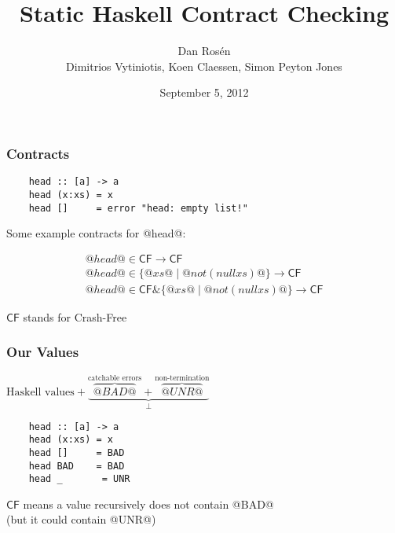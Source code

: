 \documentclass[serif,professionalfont]{beamer}
\title{ {\huge Static Haskell Contract Checking} }
\institute{ Microsoft Research }
\author{ {\Large Dan Ros\'en}
     \vspace{\baselineskip} \\
     Dimitrios Vytiniotis, Koen Claessen, Simon Peyton Jones}
\date{September 5, 2012}
\begin{document}
\maketitle
\makeatactive

\newcommand\cf[0]{\mathsf{CF}}
\newcommand\conj[0]{\&}

\begin{frame}[fragile]
  \frametitle{Contracts}
  \begin{verbatim}
    head :: [a] -> a
    head (x:xs) = x
    head []     = error "head: empty list!"
  \end{verbatim}

  Some example contracts for @head@:

  \[\begin{array}{l}
    @head@ \in \cf \to \cf \\
    @head@ \in \{ @xs@ \mid @not (null xs)@ \} \to \cf \\
    @head@ \in \cf \conj \{ @xs@ \mid @not (null xs)@ \} \to \cf
  \end{array}\]

  $\cf$ stands for Crash-Free
\end{frame}

\begin{frame}[fragile]
  \frametitle{Our Values}
    \begin{center}
    {\Large \center
    $ \text{Haskell values} +
        \underbrace{
            \overbrace{@BAD@}^{\text{catchable errors}} +
            \overbrace{@UNR@}^{\text{non-termination}}
        }_{\bot}
    $
      }

  \begin{verbatim}
    head :: [a] -> a
    head (x:xs) = x
    head []     = BAD
    head BAD    = BAD
    head _       = UNR
  \end{verbatim}

  $\cf$ means a value recursively does not contain @BAD@ \\
  (but it could contain @UNR@)
    \end{center}

\end{frame}

\newcommand\cons[2]{\mathsf{cons}(#1,#2)}
\newcommand\conspi[1]{\mathsf{cons_0}(#1)}
\newcommand\conspii[1]{\mathsf{cons_1}(#1)}
\newcommand\nil[0]{\mathsf{nil}}
\newcommand\head[1]{\mathsf{head}(#1)}
\newcommand\unr[0]{@UNR@}
\newcommand\True[0]{@True@}
\newcommand\False[0]{@False@}
\newcommand\bad[0]{@BAD@}
\end{document}
